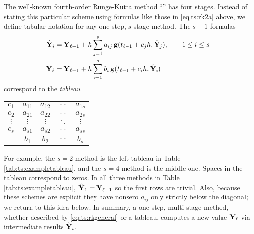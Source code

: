 The well-known fourth-order Runge-Kutta method ``\RKfour'' has four stages.  Instead of stating this particular scheme using formulas like those in \eqref{eq:ts:rk2a} above, we define tabular notation for any one-step, $s$-stage method.  The $s+1$ formulas
\begin{align}
\hat{\mathbf{Y}}_i &= \mathbf{Y}_{\ell-1} + h \sum_{j=1}^s a_{ij}\, \mathbf{g}(t_{\ell-1} + c_j h, \hat{\mathbf{Y}}_j), \qquad 1 \le i \le s \label{eq:ts:rkgeneral} \\
\mathbf{Y}_\ell  &= \mathbf{Y}_{\ell-1} + h \sum_{i=1}^s b_i\, \mathbf{g}(t_{\ell-1} + c_i h, \hat{\mathbf{Y}}_i) \notag
\end{align}
correspond to the \emph{tableau} \citep{Butcher2008}
\begin{center}
\begin{tabular}{c|cccc}
$c_1$    & $a_{11}$ & $a_{12}$ & $\cdots$ & $a_{1s}$ \\
$c_2$    & $a_{21}$ & $a_{22}$ & $\cdots$ & $a_{2s}$ \\
$\vdots$ & $\vdots$ & $\vdots$ & $\ddots$ & $\vdots$ \\
$c_s$    & $a_{s1}$ & $a_{s2}$ & $\cdots$ & $a_{ss}$ \\ \hline
         & $b_1$    & $b_2$    & $\cdots$ & $b_s$
\end{tabular}
\end{center}

For example, the $s=2$ method \RKtwoa is the left tableau in Table \ref{tab:ts:exampletableau}, and the $s=4$ method \RKfour is the middle one.  Spaces in the tableau correspond to zeros.  In all three methods in Table \ref{tab:ts:exampletableau}, $\hat{\mathbf{Y}}_1=\mathbf{Y}_{\ell-1}$ so the first rows are trivial.  Also, because these schemes are explicit they have nonzero $a_{ij}$ only strictly below the diagonal; we return to this idea below.  In summary, a one-step, multi-stage method, whether described by \eqref{eq:ts:rkgeneral} or a tableau, computes a new value $\mathbf{Y}_\ell$ via intermediate results $\hat{\mathbf{Y}}_i$.

